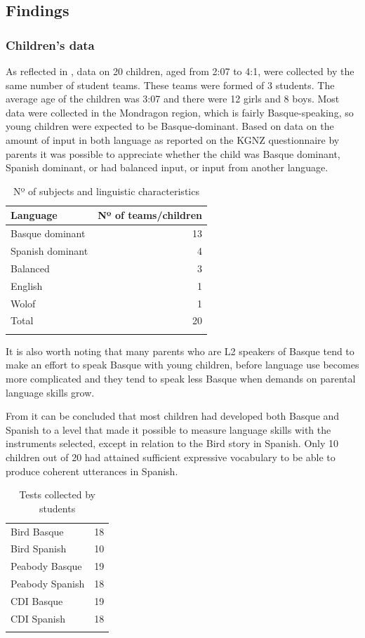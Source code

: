 \documentclass[output=paper]{../langscibook}
\begin{document}
\subsection{Findings}
\subsubsection{Children’s data}

As reflected in , data on 20 children, aged from 2:07 to 4:1, were collected by the same number of student teams. These teams were formed of 3 students. The average age of the children was 3:07 and there were 12 girls and 8 boys. Most data were collected in the Mondragon region, which is fairly Basque-speaking, so young children were expected to be Basque-dominant. Based on data on the amount of input in both language as reported on the KGNZ questionnaire by parents it was possible to appreciate whether the child was Basque dominant, Spanish dominant, or had balanced input, or input from another language.

\begin{table}
\begin{tabular}{lr}
\lsptoprule
Language & Nº of teams\slash children\\\midrule
Basque dominant & 13\\ 
Spanish dominant & 4\\
Balanced & 3\\
English & 1\\
Wolof & 1\\\midrule
Total & 20\\\lspbottomrule
\end{tabular}
\caption{Nº of subjects and linguistic characteristics\label{tab:6:1}}
\end{table}

It is also worth noting that many parents who are L2 speakers of Basque tend to make an effort to speak Basque with young children, before language use becomes more complicated and they tend to speak less Basque when demands on parental language skills grow.

From  it can be concluded that most children had developed both Basque and Spanish to a level that made it possible to measure language skills with the instruments selected, except in relation to the Bird story in Spanish. Only 10 children out of 20 had attained sufficient expressive vocabulary to be able to produce coherent utterances in Spanish.

\begin{table}
\begin{tabular}{lr}
\lsptoprule
Bird Basque & 18\\
Bird Spanish & 10\\
Peabody Basque & 19\\
Peabody Spanish & 18\\
CDI Basque & 19\\
CDI Spanish & 18\\\lspbottomrule
\end{tabular}
\caption{Tests collected by students\label{tab:6:2}}
\end{table}
\end{document}
